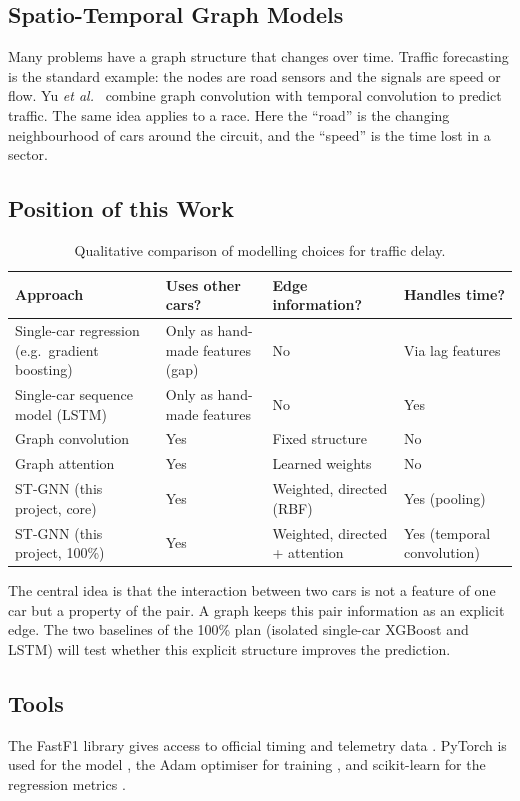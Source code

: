 \documentclass[11pt,a4paper]{article}
\begin{document}
\subsection{Spatio-Temporal Graph Models}
Many problems have a graph structure that changes over time. Traffic
forecasting is the standard example: the nodes are road sensors and the
signals are speed or flow. Yu \emph{et al.}\ \cite{yu2018} combine graph
convolution with temporal convolution to predict traffic. The same idea
applies to a race. Here the ``road'' is the changing neighbourhood of cars
around the circuit, and the ``speed'' is the time lost in a sector.

\subsection{Position of this Work}
\begin{table}[H]
\centering
\caption{Qualitative comparison of modelling choices for traffic delay.}
\label{tab:related}
\small
\begin{tabularx}{\linewidth}{@{}lXXX@{}}
\toprule
\textbf{Approach} & \textbf{Uses other cars?} & \textbf{Edge information?} & \textbf{Handles time?} \\
\midrule
Single-car regression (e.g.\ gradient boosting) & Only as hand-made features (gap) & No & Via lag features \\
Single-car sequence model (LSTM) & Only as hand-made features & No & Yes \\
Graph convolution \cite{kipf2017} & Yes & Fixed structure & No \\
Graph attention \cite{velickovic2018} & Yes & Learned weights & No \\
ST-GNN (this project, core) & Yes & Weighted, directed (RBF) & Yes (pooling) \\
ST-GNN (this project, 100\%) & Yes & Weighted, directed + attention & Yes (temporal convolution) \\
\bottomrule
\end{tabularx}
\end{table}
The central idea is that the interaction between two cars is not a feature of
one car but a property of the pair. A graph keeps this pair information as an
explicit edge. The two baselines of the 100\% plan (isolated single-car
XGBoost and LSTM) will test whether this explicit structure improves the
prediction.

\subsection{Tools}
The FastF1 library gives access to official timing and telemetry data
\cite{fastf1}. PyTorch is used for the model \cite{paszke2019}, the Adam
optimiser for training \cite{kingma2015}, and scikit-learn for the regression
metrics \cite{pedregosa2011}.
\end{document}
